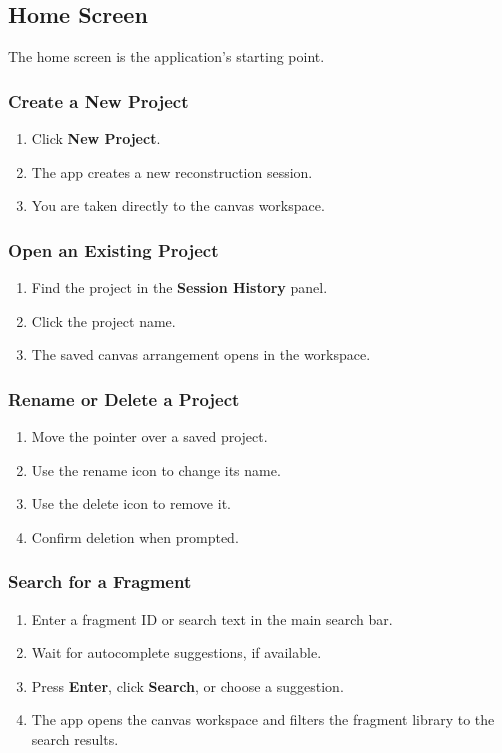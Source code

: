 \documentclass[12pt]{article}
\begin{document}
\subsection{Home Screen}
The home screen is the application's starting point.

\subsubsection{Create a New Project}
\begin{enumerate}
  \item Click \textbf{New Project}.
  \item The app creates a new reconstruction session.
  \item You are taken directly to the canvas workspace.
\end{enumerate}

\subsubsection{Open an Existing Project}
\begin{enumerate}
  \item Find the project in the \textbf{Session History} panel.
  \item Click the project name.
  \item The saved canvas arrangement opens in the workspace.
\end{enumerate}

\subsubsection{Rename or Delete a Project}
\begin{enumerate}
  \item Move the pointer over a saved project.
  \item Use the rename icon to change its name.
  \item Use the delete icon to remove it.
  \item Confirm deletion when prompted.
\end{enumerate}

\subsubsection{Search for a Fragment}
\begin{enumerate}
  \item Enter a fragment ID or search text in the main search bar.
  \item Wait for autocomplete suggestions, if available.
  \item Press \textbf{Enter}, click \textbf{Search}, or choose a suggestion.
  \item The app opens the canvas workspace and filters the fragment library to the search results.
\end{enumerate}
\end{document}
